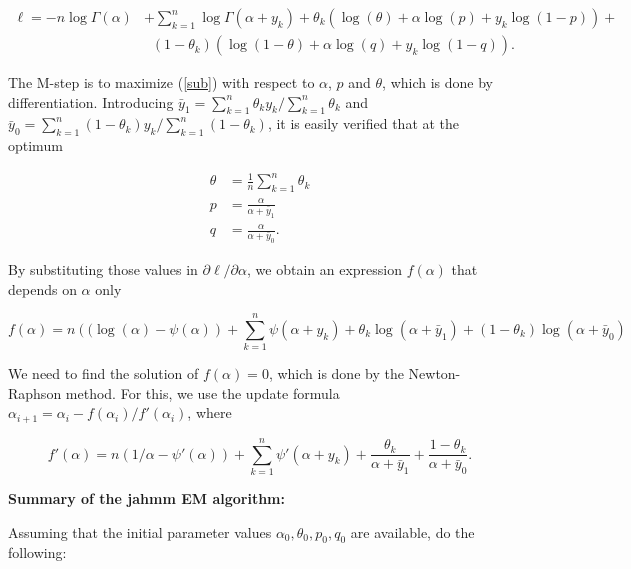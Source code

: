 \documentclass[12pt]{article}
\begin{document}
\begin{appendices}
    \begin{align}
    \ell = -n \log \Gamma(\alpha) &+ \sum_{k=1}^n
      \log \Gamma(\alpha + y_k) + \nonumber
    \theta_k (\log(\theta) + \alpha \log(p) +
    y_k \log(1-p)) + \nonumber \\
    &\;\; (1-\theta_k) (\log(1-\theta) + \alpha \log(q) +
    y_k \log(1-q)).
\label{sub}
    \end{align}

    The M-step is to maximize (\ref{sub}) with respect to
    $\alpha$, $p$ and $\theta$, which is done by
    differentiation. Introducing
    $\bar{y}_1 = \sum_{k=1}^n \theta_k y_k / \sum_{k=1}^n \theta_k$
    and $\bar{y}_0 = \sum_{k=1}^n (1-\theta_k) y_k /
    \sum_{k=1}^n (1-\theta_k)$, it is easily verified that at
    the optimum

    \begin{align*}
    \theta &= \frac{1}{n}\sum_{k=1}^n\theta_k \\
    p &= \frac{\alpha} {\alpha+\bar{y}_1} \\
    q &= \frac{\alpha} {\alpha+\bar{y}_0}.
    \end{align*}

    By substituting those values in $\partial \ell / \partial \alpha$,
    we obtain an expression $f(\alpha)$ that depends on $\alpha$ only

    \begin{equation*}
       f(\alpha) = n \left( (\log(\alpha) - \psi(\alpha) \right) +
      \sum_{k=1}^n \psi(\alpha+y_k) + \theta_k \log(\alpha + \bar{y}_1)
      + (1-\theta_k) \log(\alpha + \bar{y}_0)
    \end{equation*}

    We need to find the solution of $f(\alpha) = 0$, which is done by
    the Newton-Raphson method. For this, we use the update formula
    $\alpha_{i+1} = \alpha_i - f(\alpha_i)/f'(\alpha_i)$, where

    \begin{equation*}
      f'(\alpha) = n \left( 1/\alpha - \psi'(\alpha) \right) +
      \sum_{k=1}^n \psi'(\alpha+y_k) +
      \frac{\theta_k}{\alpha+\bar{y}_1} +
      \frac{1-\theta_k}{\alpha + \bar{y}_0}.
    \end{equation*}

\noindent
    \textbf{Summary of the jahmm EM algorithm:} \par
    Assuming that the initial parameter values
    $\alpha_0, \theta_0, p_0, q_0$ are available, do the following:

    \begin{enumerate}


\end{enumerate}
\end{appendices}
\end{document}
